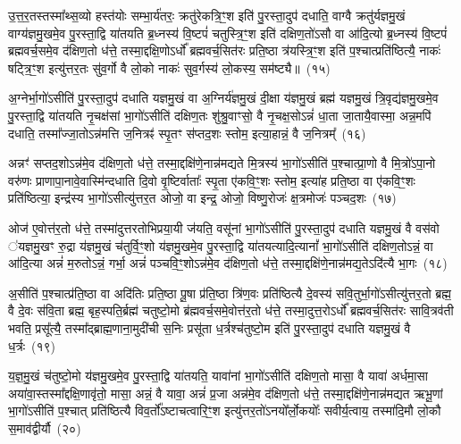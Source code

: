 उ॒त्त॒र॒तस्तस्मा᳚थ्स॒व्यो हस्त॑योः सम्भा॒र्य॑तरः॒ क्रतु॑रेकत्रि॒ꣳ॒श इति॑ पु॒रस्ता॒दुप॑ दधाति॒ वाग्वै क्रतु॑र्यज्ञमु॒खं वाग्य॑ज्ञमु॒खमे॒व पु॒रस्ता॒द्वि या॑तयति ब्र॒ध्नस्य॑ वि॒ष्टपं॑ चतुस्त्रि॒ꣳ॒श इति॑ दक्षिण॒तो॑\-ऽसौ वा आ॑दि॒त्यो ब्र॒ध्नस्य॑ वि॒ष्टपं॑ ब्रह्मवर्च॒समे॒व द॑क्षिण॒तो ध॑त्ते॒ तस्मा॒द्दक्षि॒णो\-ऽर्धो᳚ ब्रह्मवर्च॒सित॑रः प्रति॒ष्ठा त्र॑यस्त्रि॒ꣳ॒श इति॑ प॒श्चात्प्रति॑ष्ठित्यै॒ नाकः॑ षट्त्रि॒ꣳ॒श इत्यु॑त्तर॒तः सु॑व॒र्गो वै लो॒को नाकः॑ सुव॒र्गस्य॑ लो॒कस्य॒ सम॑ष्ट्यै॥~(१५)

{\anuvakamend[{वै त्रि॒वृदिति॑ पु॒रस्ता᳚थ्स॒व्यस्त्र॑योवि॒ꣳ॒श इति॑ सुव॒र्गो वै पञ्च॑ च}]}%

अ॒ग्नेर्भा॒गो॑\-ऽसीति॑ पु॒रस्ता॒दुप॑ दधाति यज्ञमु॒खं वा अ॒ग्निर्य॑ज्ञमु॒खं दी॒क्षा य॑ज्ञमु॒खं ब्रह्म॑ यज्ञमु॒खं त्रि॒वृद्य॑ज्ञमु॒खमे॒व पु॒रस्ता॒द्वि या॑तयति नृ॒चक्ष॑सां भा॒गो॑\-ऽसीति॑ दक्षिण॒तः शु॑श्रु॒वाꣳसो॒ वै नृ॒चक्ष॒सो\-ऽन्नं॑ धा॒ता जा॒तायै॒वास्मा॒ अन्न॒मपि॑ दधाति॒ तस्मा᳚ज्जा॒तो\-ऽन्न॑मत्ति ज॒नित्रꣴ॑ स्पृ॒तꣳ स॑प्तद॒शः स्तोम॒ इत्या॒हान्नं॒ वै ज॒नित्रम्᳚~(१६)

अन्नꣳ॑ सप्तद॒शो\-ऽन्न॑मे॒व द॑क्षिण॒तो ध॑त्ते॒ तस्मा॒द्दक्षि॑णे॒नान्न॑मद्यते मि॒त्रस्य॑ भा॒गो॑\-ऽसीति॑ प॒श्चात्प्रा॒णो वै मि॒त्रो॑\-ऽपा॒नो वरु॑णः प्राणापा॒नावे॒वास्मि॑न्दधाति दि॒वो वृ॒ष्टिर्वाताः᳚ स्पृ॒ता ए॑कवि॒ꣳ॒शः स्तोम॒ इत्या॑ह प्रति॒ष्ठा वा ए॑कवि॒ꣳ॒शः प्रति॑ष्ठित्या॒ इन्द्र॑स्य भा॒गो॑\-ऽसीत्यु॑त्तर॒त ओजो॒ वा इन्द्र॒ ओजो॒ विष्णु॒रोजः॑ क्ष॒त्रमोजः॑ पञ्चद॒शः~(१७)

ओज॑ ए॒वोत्त॑र॒तो ध॑त्ते॒ तस्मा॑दुत्तरतोभिप्रया॒यी ज॑यति॒ वसू॑नां भा॒गो॑\-ऽसीति॑ पु॒रस्ता॒दुप॑ दधाति यज्ञमु॒खं वै वस॑वो ॑यज्ञमु॒खꣳ रु॒द्रा य॑ज्ञमु॒खं च॑तुर्वि॒ꣳ॒शो य॑ज्ञमु॒खमे॒व पु॒रस्ता॒द्वि या॑तयत्यादि॒त्यानां᳚ भा॒गो॑\-ऽसीति॑ दक्षिण॒तो\-ऽन्नं॒ वा आ॑दि॒त्या अन्नं॑ म॒रुतो\-ऽन्नं॒ गर्भा॒ अन्नं॑ पञ्चवि॒ꣳ॒शो\-ऽन्न॑मे॒व द॑क्षिण॒तो ध॑त्ते॒ तस्मा॒द्दक्षि॑णे॒नान्न॑मद्य॒ते\-ऽदि॑त्यै भा॒गः~(१८)

अ॒सीति॑ प॒श्चात्प्र॑ति॒ष्ठा वा अदि॑तिः प्रति॒ष्ठा पू॒षा प्र॑ति॒ष्ठा त्रि॑ण॒वः प्रति॑ष्ठित्यै दे॒वस्य॑ सवि॒तुर्भा॒गो॑\-ऽसीत्यु॑त्तर॒तो ब्रह्म॒ वै दे॒वः स॑वि॒ता ब्रह्म॒ बृह॒स्पति॒र्ब्रह्म॑ चतुष्टो॒मो ब्र॑ह्मवर्च॒समे॒वोत्त॑र॒तो ध॑त्ते॒ तस्मा॒दुत्त॒रो\-ऽर्धो᳚ ब्रह्मवर्च॒सित॑रः सावि॒त्रव॑ती भवति॒ प्रसू᳚त्यै॒ तस्मा᳚द्ब्राह्म॒णाना॒मुदी॑ची स॒निः प्रसू॑ता ध॒र्त्रश्च॑तुष्टो॒म इति॑ पु॒रस्ता॒दुप॑ दधाति यज्ञमु॒खं वै ध॒र्त्रः~(१९)

य॒ज्ञ॒मु॒खं च॑तुष्टो॒मो य॑ज्ञमु॒खमे॒व पु॒रस्ता॒द्वि या॑तयति॒ यावा॑नां भा॒गो॑\-ऽसीति॑ दक्षिण॒तो मासा॒ वै यावा॑ अर्धमा॒सा अया॑वा॒स्तस्मा᳚द्दक्षि॒णावृ॑तो॒ मासा॒ अन्नं॒ वै यावा॒ अन्नं॑ प्र॒जा अन्न॑मे॒व द॑क्षिण॒तो ध॑त्ते॒ तस्मा॒द्दक्षि॑णे॒नान्न॑मद्यत ऋभू॒णां भा॒गो॑\-ऽसीति॑ प॒श्चात् प्रति॑ष्ठित्यै विव॒र्तो᳚\-ऽष्टाचत्वारि॒ꣳ॒श इत्यु॑त्तर॒तो॑\-ऽनयो᳚र्लो॒कयोः᳚ सवीर्य॒त्वाय॒ तस्मा॑दि॒मौ लो॒कौ स॒माव॑द्वीर्यौ~(२०)

